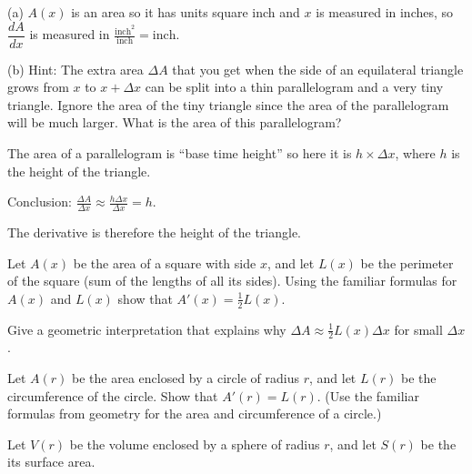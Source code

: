\begin{multicols}{2}
\answer 
(a) $A(x)$ is an area so it has units square inch and $x$ is
measured in inches, so $\dfrac{dA}{dx}$ is measured in
$\displaystyle\frac{\text{inch}^2}{\text{inch}} = \text{inch}$.



(b) Hint: The extra area $\Delta A$ that you get when the side of
an equilateral triangle grows from $x$ to $x+\Delta x$ can be
split into a thin parallelogram and a very tiny triangle.  Ignore
the area of the tiny triangle since the area of the parallelogram
will be much larger.  What is the area of this parallelogram?




The area of a parallelogram is ``base time height'' so here it is
$h\times\Delta x$, where $h$ is the height of the triangle.




Conclusion: $\displaystyle \frac{\Delta A}{\Delta x}
\approx\frac{h\Delta x}{\Delta x} = h$.




The derivative is therefore the height of the triangle.




\endanswer








\problem \groupproblem Let $A(x)$ be the area of a square with 
side $x$, and let $L(x)$ be
the perimeter of the square (sum of the lengths of all its sides).
Using the familiar formulas for $A(x)$ and $L(x)$ show that $A'(x) =
\frac12 L(x)$.


Give a geometric interpretation that explains why $\Delta A \approx
\frac12 L(x) \Delta x$ for small $\Delta x$.








\problem Let $A(r)$ be the area enclosed by a circle of radius $r$, and let 
$L(r)$ be the circumference of the circle.  Show that $ A'(r) = L(r) $.
(Use the familiar formulas from geometry for the area and circumference
of a circle.)






\problem Let $V(r)$ be the volume enclosed by a sphere of radius $r$, and let 
$S(r)$ be the its surface area.



\end{multicols}
